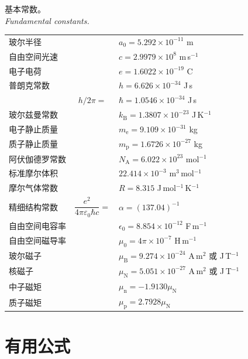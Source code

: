\begin{center}
\smallskip
{基本常数。\\
{\footnotesize\itshape Fundamental constants.}}
\begin{small}
\begin{tabular}{lcl}
\toprule
玻尔半径 & & $a_0 = 5.292\times10^{-11}$ m\\
自由空间光速 & & $c = 2.9979\times10^{8}$ m\,s$^{-1}$\\
电子电荷 & & $e = 1.6022\times10^{-19}$ C\\
普朗克常数 & & $h = 6.626\times10^{-34}$ J\,s\\
 & $h/2\pi=$ & $\hbar = 1.0546\times10^{-34}$ J\,s\\
玻尔兹曼常数 & & $k_{\mathrm{B}} = 1.3807\times10^{-23}$ J\,K$^{-1}$\\
电子静止质量 & & $m_{\mathrm{e}} = 9.109\times10^{-31}$ kg\\
质子静止质量 & & $m_{\mathrm{p}} = 1.6726\times10^{-27}$ kg\\
阿伏伽德罗常数 & & $N_{\mathrm{A}} = 6.022\times10^{23}$ mol$^{-1}$\\
标准摩尔体积 & & $22.414\times10^{-3}$ m$^{3}$\,mol$^{-1}$\\
摩尔气体常数 & & $R = 8.315$ J\,mol$^{-1}$\,K$^{-1}$\\
精细结构常数 & $\dfrac{e^{2}}{4\pi\varepsilon_0\hbar c}=$ & $\alpha = (137.04)^{-1}$\\[8pt]
自由空间电容率 & & $\epsilon_0 = 8.854\times10^{-12}$ F\,m$^{-1}$\\
自由空间磁导率 & & $\mu_0 = 4\pi\times10^{-7}$ H\,m$^{-1}$\\
玻尔磁子 & & $\mu_{\mathrm{B}} = 9.274\times10^{-24}$ A\,m$^{2}$ 或 J\,T$^{-1}$\\
核磁子 & & $\mu_{\mathrm{N}} = 5.051\times10^{-27}$ A\,m$^{2}$ 或 J\,T$^{-1}$\\
中子磁矩 & & $\mu_{\mathrm{n}} = -1.9130\mu_{\mathrm{N}}$\\
质子磁矩 & & $\mu_{\mathrm{p}} = 2.7928\mu_{\mathrm{N}}$\\
\bottomrule
\end{tabular}
\end{small}
\end{center}

\section{有用公式}

